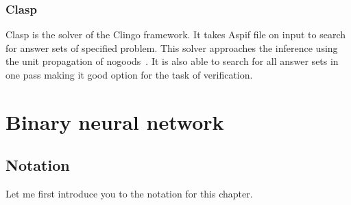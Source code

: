 \documentclass[
    digital,
    color,
    oneside,
    sansbold,
    lot,
    nolof
]{fithesis}
\begin{document}
\subsection{Clasp}

Clasp is the solver of the Clingo framework. It takes Aspif file on input
to search for answer sets of specified problem. This solver approaches the
inference using the unit propagation of nogoods~\cite{DBLP:journals/ai/GebserKS12}.
It is also able to search
for all answer sets in one pass making it good option for the task of verification.

\chapter{Binary neural network}

\section*{Notation}

Let me first introduce you to the notation for this chapter.
\end{document}
